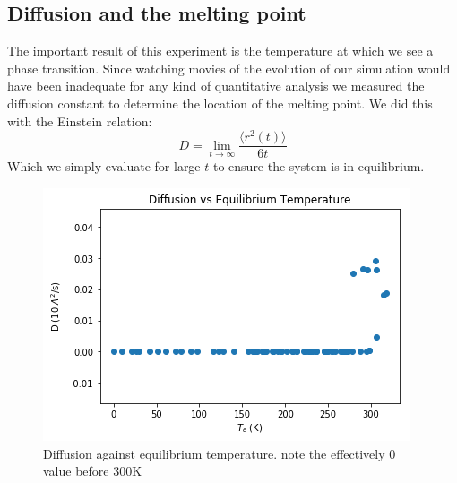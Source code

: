 \documentclass[11pt,twocolumn]{article}
\begin{document}
\subsection{Diffusion and the melting point}
The important result of this experiment is the temperature at which we see a phase transition. Since watching movies of the evolution of our simulation would have been inadequate for any kind of quantitative analysis we measured the diffusion constant to determine the location of the melting point. We did this with the Einstein relation:
\begin{equation}
D = \lim_{t \to \infty} \frac{\langle r^2(t) \rangle}{6t}
\end{equation}
Which we simply evaluate for large $t$ to ensure the system is in equilibrium. 

\begin{figure}
\includegraphics[width=\columnwidth]{tevd.png}
\caption{Diffusion against equilibrium temperature. note the effectively 0 value before 300K}
\label{eq}
\end{figure}
\end{document}
